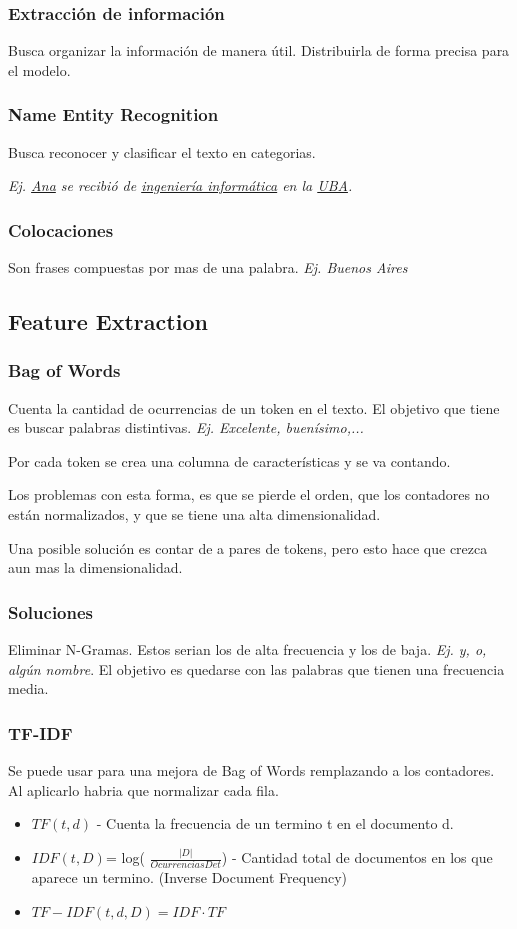 \documentclass[titlepage,a4paper]{article}
\begin{document}
\subsubsection*{Extracción de información}
Busca organizar la información de manera útil. Distribuirla de forma precisa para el modelo.

\subsubsection*{Name Entity Recognition}
Busca reconocer y clasificar el texto en categorias.

\textit{Ej. \underline{Ana} se recibió de \underline{ingeniería informática} en la \underline{UBA}.}

\subsubsection*{Colocaciones}
Son frases compuestas por mas de una palabra. \textit{Ej. Buenos Aires}

\subsection{Feature Extraction}
\subsubsection*{Bag of Words}
Cuenta la cantidad de ocurrencias de un token en el texto. El objetivo que tiene es buscar palabras distintivas. \textit{Ej. Excelente, buenísimo,...}

Por cada token se crea una columna de características y se va contando.

Los problemas con esta forma, es que se pierde el orden, que los contadores no están normalizados, y que se tiene una alta dimensionalidad.

Una posible solución es contar de a pares de tokens, pero esto hace que crezca aun mas la dimensionalidad.

\subsubsection*{Soluciones}
Eliminar N-Gramas. Estos serian los de alta frecuencia y los de baja. \textit{Ej. y, o, algún nombre}. El objetivo es quedarse con las palabras que tienen una frecuencia media.


\subsubsection*{TF-IDF}
Se puede usar para una mejora de Bag of Words remplazando a los contadores. Al aplicarlo habria que normalizar cada fila.
\begin{itemize}
\item $TF(t,d)$ - Cuenta la frecuencia de un termino t en el documento d.
\item $IDF(t,D)$= log( $\frac{|D|}{Ocurrencias De t} $) - Cantidad total de documentos en los que aparece un termino. (Inverse Document Frequency)
\item $TF-IDF(t,d,D) = IDF \cdot TF$
\end{itemize}
\end{document}

